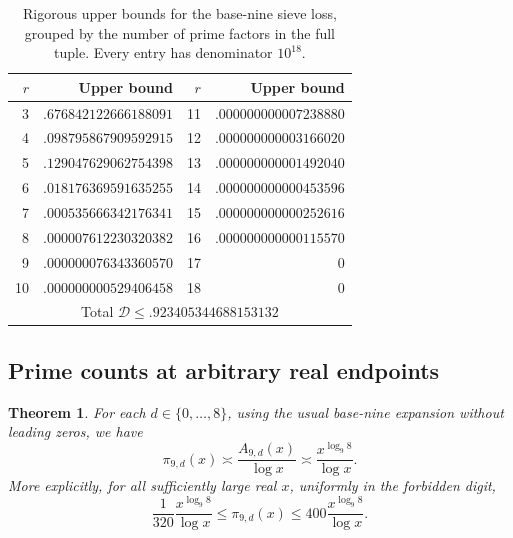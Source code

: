 \documentclass[11pt,a4paper]{article}
\theoremstyle{paperplain}
\newtheorem{theorem}{Theorem}[section]
\numberwithin{equation}{section}
\begin{document}
\begin{table}[tbp]
 \centering
 \caption{Rigorous upper bounds for the base-nine sieve loss, grouped by the
 number of prime factors in the full tuple. Every entry has denominator $10^{18}$.}
 \label{nine:loss-table}
 \begin{tabular}{rr@{\qquad}rr}
 \toprule
 $r$&Upper bound&$r$&Upper bound\\\midrule
 3&$.676842122666188091$&11&$.000000000007238880$\\
 4&$.098795867909592915$&12&$.000000000003166020$\\
 5&$.129047629062754398$&13&$.000000000001492040$\\
 6&$.018176369591635255$&14&$.000000000000453596$\\
 7&$.000535666342176341$&15&$.000000000000252616$\\
 8&$.000007612230320382$&16&$.000000000000115570$\\
 9&$.000000076343360570$&17&$0$\\
 10&$.000000000529406458$&18&$0$\\\midrule
 \multicolumn{4}{c}{Total $\mathcal D\le .923405344688153132$}\\\bottomrule
 \end{tabular}
\end{table}

\subsection{Prime counts at arbitrary real endpoints}

\begin{theorem}\label{nine:theorem}
For each $d\in\{0,\ldots,8\}$, using the usual base-nine expansion without
leading zeros, we have
\[
 \pi_{9,d}(x)\asymp\frac{A_{9,d}(x)}{\log x}
 \asymp\frac{x^{\log_9 8}}{\log x}.
\]
More explicitly, for all sufficiently large real $x$, uniformly in the
forbidden digit,
\begin{equation}\label{nine:explicit}
 \frac1{320}\frac{x^{\log_9 8}}{\log x}
 \le\pi_{9,d}(x)\le400\frac{x^{\log_9 8}}{\log x}.
\end{equation}
\end{theorem}
\end{document}

